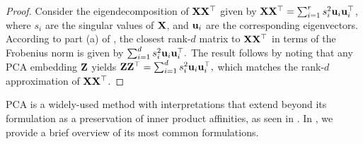 \begin{proof}
    Consider the eigendecomposition of ${\mathbf{X}} {\mathbf{X}}^\top$ given by ${\mathbf{X}} {\mathbf{X}}^\top = \sum_{i=1}^{r} s_i^2 {\mathbf{u}}_i {\mathbf{u}}_i^\top$, where $s_i$ are the singular values of ${\mathbf{X}}$, and ${\mathbf{u}}_i$ are the corresponding eigenvectors. According to part (a) of , the closest rank-$d$ matrix to ${\mathbf{X}} {\mathbf{X}}^\top$ in terms of the Frobenius norm is given by
    $
    \sum_{i=1}^{d} s_i^2 {\mathbf{u}}_i {\mathbf{u}}_i^\top.
    $
    The result follows by noting that any PCA embedding ${\mathbf{Z}}$ yields 
    $
    {\mathbf{Z}} {\mathbf{Z}}^\top = \sum_{i=1}^{d} s_i^2 {\mathbf{u}}_i {\mathbf{u}}_i^\top,
    $
    which matches the rank-$d$ approximation of ${\mathbf{X}} {\mathbf{X}}^\top$.
\end{proof}


PCA is a widely-used method with interpretations that extend beyond its formulation as a preservation of inner product affinities, as seen in . In , we provide a brief overview of its most common formulations.
	

